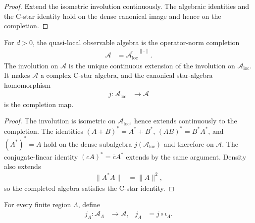 \begin{proof}\leanok
    Extend the isometric involution continuously. The algebraic identities and
    the C-star identity hold on the dense canonical image and hence on the
    completion.
\end{proof}

\begin{definition}
    \label{def:qca_quasi_local_algebra}
    \leanok
    For $d>0$, the quasi-local observable algebra is the operator-norm
    completion
    \begin{align}
        \mathcal A
         & =\overline{\mathcal A_{\mathrm{loc}}}^{\lVert\cdot\rVert}.
    \end{align}
    The involution on $\mathcal A$ is the unique continuous extension of the
    involution on $\mathcal A_{\mathrm{loc}}$.  It makes $\mathcal A$ a complex
    C-star algebra, and the canonical star-algebra homomorphism
    \begin{align}
        j\colon\mathcal A_{\mathrm{loc}} & \longrightarrow\mathcal A
    \end{align}
    is the completion map.
\end{definition}

\begin{proof}\leanok
    The involution is isometric on $\mathcal A_{\mathrm{loc}}$, hence extends
    continuously to the completion.  The identities
    $(A+B)^*=A^*+B^*$, $(AB)^*=B^*A^*$, and $(A^*)^*=A$
    hold on the dense subalgebra $j(\mathcal A_{\mathrm{loc}})$ and therefore
    on $\mathcal A$.  The conjugate-linear identity
    $(cA)^*=\overline cA^*$ extends by the same argument.  Density also extends
    \begin{align}
        \lVert A^*A\rVert & =\lVert A\rVert^2,
    \end{align}
    so the completed algebra satisfies the C-star identity.
\end{proof}

\begin{definition}
    \label{def:qca_quasi_local_observable}
    \leanok
    For every finite region $\Lambda$, define
    \begin{align}
        j_\Lambda\colon\mathcal A_\Lambda & \longrightarrow\mathcal A,
                                          & j_\Lambda                  & =j\circ\iota_\Lambda.
    \end{align}
\end{definition}

